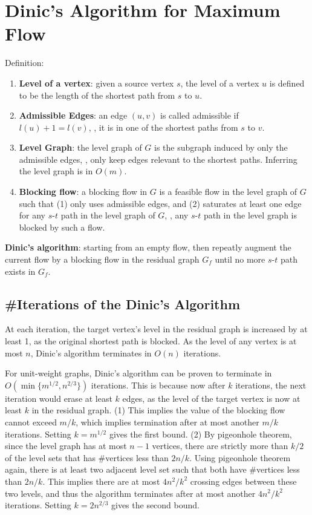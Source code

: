\section{Dinic's Algorithm for Maximum Flow}

Definition:
\begin{enumerate}
    \item \textbf{Level of a vertex}: given a source vertex $s$, the level of a vertex $u$ is defined to be the length of the shortest path from $s$ to $u$.
    \item \textbf{Admissible Edges}: an edge $(u, v)$ is called admissible if $l(u)+1=l(v)$, \ie, it is in one of the shortest paths from $s$ to $v$.
    \item \textbf{Level Graph}: the level graph of $G$ is the subgraph induced by only the admissible edges, \ie, only keep edges relevant to the shortest paths. Inferring the level graph is in $O(m)$.
    \item \textbf{Blocking flow}: a blocking flow in $G$ is a feasible flow in the level graph of $G$ such that (1) only uses admissible edges, and (2) saturates at least one edge for any $s$-$t$ path in the level graph of $G$, \ie, any $s$-$t$ path in the level graph is blocked by such a flow.
\end{enumerate}

\textbf{Dinic's algorithm}: starting from an empty flow, then repeatly augment the current flow by a blocking flow in the residual graph $G_f$ until no more $s$-$t$ path exists in $G_f$.

\subsection{\#Iterations of the Dinic's Algorithm}

At each iteration, the target vertex's level in the residual graph is increased by at least 1, as the original shortest path is blocked. As the level of any vertex is at most $n$, Dinic's algorithm terminates in $O(n)$ iterations. 

For unit-weight graphs, Dinic's algorithm can be proven to terminate in $O(\min\{m^{1/2}, n^{2/3}\})$ iterations. This is because now after $k$ iterations, the next iteration would erase at least $k$ edges, as the level of the target vertex is now at least $k$ in the residual graph. (1) This implies the value of the blocking flow cannot exceed $m/k$, which implies termination after at most another $m/k$ iterations. Setting $k=m^{1/2}$ gives the first bound. (2) By pigeonhole theorem, since the level graph has at most $n-1$ vertices, there are strictly more than $k/2$ of the level sets that has \#vertices less than $2n/k$. Using pigeonhole theorem again, there is at least two adjacent level set such that both have \#vertices less than $2n/k$. This implies there are at most $4n^2/k^2$ crossing edges between these two levels, and thus the algorithm terminates after at most another $4n^2/k^2$ iterations. Setting $k=2n^{2/3}$ gives the second bound.

